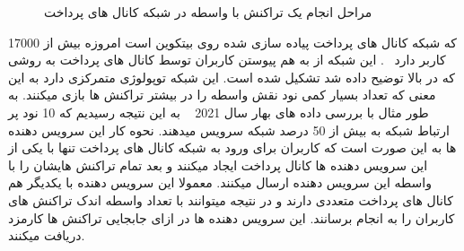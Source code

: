   
\begin{figure}
     \centering
     \begin{subfigure}[b]{0.48\textwidth}
         \centering
         \caption{}
         \label{شکل:تراکنش با واسطه مرحله یک}
     \end{subfigure}
     \hfill
     \begin{subfigure}[b]{0.48\textwidth}
         \centering
         \caption{}
         \label{شکل:تراکنش با واسطه مرحله دو}
     \end{subfigure}


\begin{subfigure}[b]{0.48\textwidth}
         \centering
         \caption{}
         \label{شکل:تراکنش با واسطه مرحله سه}
     \end{subfigure}
     \hfill
     \begin{subfigure}[b]{0.48\textwidth}
         \centering
         \caption{}
         \label{شکل:تراکنش با واسطه مرحله چهار}
     \end{subfigure}
        \caption{مراحل انجام یک تراکنش با واسطه در شبکه کانال های پرداخت}
        \label{شکل: تراکنش با واسطه}
\end{figure}


 که شبکه کانال های پرداخت پیاده سازی شده روی بیتکوین است امروزه بیش از 17000 کاربر دارد
~\cite{1ml}.
این شبکه از به هم پیوستن کاربران توسط کانال های پرداخت به روشی که در بالا توضیح داده شد تشکیل شده است. این شبکه توپولوژی متمرکزی دارد به این معنی که تعداد بسیار کمی نود نقش واسطه را در بیشتر تراکنش ها بازی میکنند. به طور مثال با بررسی داده های بهار سال 2021
~\cite{lngossip}
به این نتیجه رسیدیم که 10 نود پر ارتباط شبکه به بیش از 50 درصد شبکه سرویس میدهند. نحوه کار این سرویس دهنده ها به این صورت است که کاربران برای ورود به شبکه کانال های پرداخت تنها با یکی از این سرویس دهنده ها کانال پرداخت ایجاد میکنند و بعد تمام تراکنش هایشان را با واسطه این سرویس دهنده ارسال میکنند. معمولا این سرویس دهنده با  یکدیگر هم کانال های پرداخت متعددی دارند و در نتیجه میتوانند با تعداد واسطه اندک تراکنش های کاربران را به انجام برسانند. این سرویس دهنده ها در ازای جابجایی تراکنش ها کارمزد دریافت میکنند.




